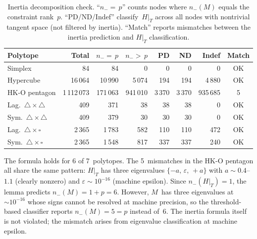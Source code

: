 \begin{table}[h]
\centering
\small
\begin{tabular}{lrrrrrrc}
\toprule
Polytope & Total & $n_- {=}\, p$ & $n_- {>}\, p$ & PD & ND & Indef & Match \\
\midrule
Simplex              &         84 &        84 &       0 &     0 &     0 &       0 & OK \\
Hypercube            &     16\,064 &    10\,990 &   5\,074 &   194 &   194 &   4\,880 & OK \\
HK-O pentagon        &  1\,112\,073 &   171\,063 & 941\,010 & 3\,370 & 3\,370 & 935\,685 & 5 \\
Lag.\ $\triangle{\times}\triangle$ &        409 &       371 &      38 &    38 &    38 &       0 & OK \\
Sym.\ $\triangle{\times}\triangle$ &        409 &       379 &      30 &    30 &    30 &       0 & OK \\
Lag.\ $\triangle{\times}\square$   &      2\,365 &     1\,783 &     582 &   110 &   110 &     472 & OK \\
Sym.\ $\triangle{\times}\square$   &      2\,365 &     1\,548 &     817 &   337 &   337 &     240 & OK \\
\bottomrule
\end{tabular}
\caption{Inertia decomposition check.
  ``$n_- {=}\, p$'' counts nodes where $n_-(M)$ equals
  the constraint rank~$p$.
  ``PD/ND/Indef'' classify~$H|_T$ across all nodes with
  nontrivial tangent space (not filtered by inertia).
  ``Match'' reports mismatches between the inertia prediction
  and $H|_T$ classification.}
\label{tab:kkt-inertia}
\end{table}

\begin{unverified}
The formula holds for 6 of 7~polytopes.
The 5~mismatches in the HK-O pentagon all share the same pattern:
$H|_T$ has three eigenvalues $\{-a,\, \varepsilon,\, +a\}$
with $a \sim 0.4$--$1.1$ (clearly nonzero) and
$\varepsilon \sim 10^{-16}$ (machine epsilon).
Since $n_-(H|_T) = 1$, the lemma predicts $n_-(M) = 1 + p = 6$.
However, $M$~has three eigenvalues at ${\sim}10^{-16}$
whose signs cannot be resolved at machine precision,
so the threshold-based classifier reports $n_-(M) = 5 = p$
instead of~$6$.
The inertia formula itself is not violated;
the mismatch arises from eigenvalue classification at
machine epsilon.
\end{unverified}
